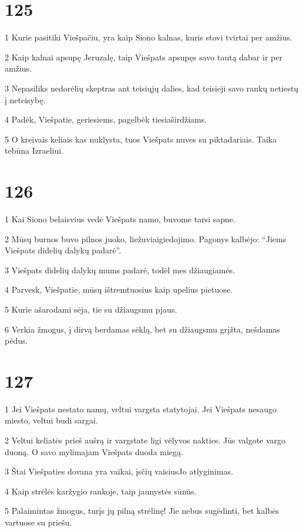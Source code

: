 \chapter{125}


\par 1 Kurie pasitiki Viešpačiu, yra kaip Siono kalnas, kuris stovi tvirtai per amžius. 
\par 2 Kaip kalnai apsupę Jeruzalę, taip Viešpats apsupęs savo tautą dabar ir per amžius. 
\par 3 Nepasiliks nedorėlių skeptras ant teisiųjų dalies, kad teisieji savo rankų netiestų į neteisybę. 
\par 4 Padėk, Viešpatie, geriesiems, pagelbėk tiesiaširdžiams. 
\par 5 O kreivais keliais kas nuklysta, tuos Viešpats nuves su piktadariais. Taika tebūna Izraeliui.


\chapter{126}


\par 1 Kai Siono belaisvius vedė Viešpats namo, buvome tarsi sapne. 
\par 2 Mūsų burnos buvo pilnos juoko, liežuviai­giedojimo. Pagonys kalbėjo: “Jiems Viešpats didelių dalykų padarė”. 
\par 3 Viešpats didelių dalykų mums padarė, todėl mes džiaugiamės. 
\par 4 Parvesk, Viešpatie, mūsų ištremtuosius kaip upelius pietuose. 
\par 5 Kurie ašarodami sėja, tie su džiaugsmu pjaus. 
\par 6 Verkia žmogus, į dirvą berdamas sėklą, bet su džiaugsmu grįžta, nešdamas pėdus.


\chapter{127}


\par 1 Jei Viešpats nestato namų, veltui vargsta statytojai. Jei Viešpats nesaugo miesto, veltui budi sargai. 
\par 2 Veltui keliatės prieš aušrą ir vargstate ligi vėlyvos nakties. Jūs valgote vargo duoną. O savo mylimajam Viešpats duoda miegą. 
\par 3 Štai Viešpaties dovana yra vaikai, įsčių vaisius­Jo atlyginimas. 
\par 4 Kaip strėlės karžygio rankoje, taip jaunystės sūnūs. 
\par 5 Palaimintas žmogus, turįs jų pilną strėlinę! Jie nebus sugėdinti, bet kalbės vartuose su priešu.


